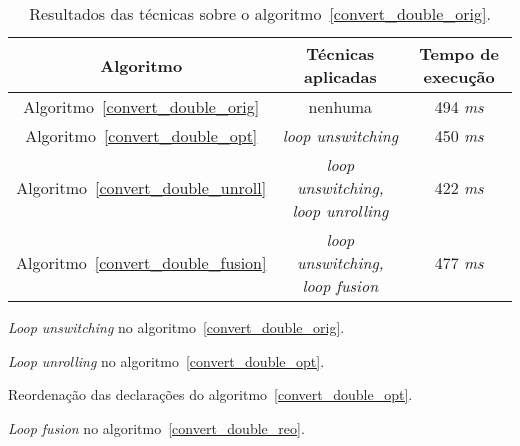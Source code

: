 \begin{table}[ht]
  \label{tabela_convert_double}
\begin{center}
  \begin{tabular}{|c|c|c|}
    \hline
    \textbf{Algoritmo} & \textbf{Técnicas aplicadas} & \textbf{Tempo de execução}\\
    \hline
    Algoritmo~\ref{convert_double_orig} & nenhuma & 494 \textit{ms} \\
    \hline
    Algoritmo~\ref{convert_double_opt} & \textit{loop unswitching} & 450 \textit{ms} \\
    \hline
    Algoritmo~\ref{convert_double_unroll} & \textit{loop unswitching, loop
                                unrolling}& 422 \textit{ms} \\
    \hline
    Algoritmo~\ref{convert_double_fusion} & \textit{loop unswitching, loop fusion} & 477 \textit{ms} \\
    \hline
  \end{tabular}
  \caption{Resultados das técnicas sobre o algoritmo~\ref{convert_double_orig}.}
\end{center}
\end{table}



\begin{algorithm}[H]
  \caption{\textit{Loop unswitching} no algoritmo~\ref{convert_double_orig}.}
\label{convert_double_opt}

\end{algorithm}

\begin{algorithm}[H]
  \caption{\textit{Loop unrolling} no algoritmo~\ref{convert_double_opt}.}
\label{convert_double_unroll}

\end{algorithm}

\begin{algorithm}[H]
  \caption{Reordenação das declarações do algoritmo~\ref{convert_double_opt}.}
\label{convert_double_reo}

\end{algorithm}

\begin{algorithm}[H]
  \caption{\textit{Loop fusion} no algoritmo~\ref{convert_double_reo}.}
\label{convert_double_fusion}

\end{algorithm}
